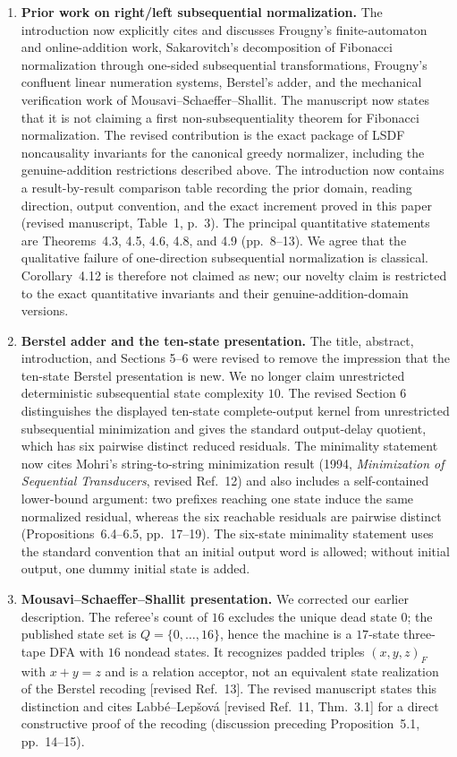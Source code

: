 \documentclass[11pt]{article}
\begin{document}
\begin{enumerate}[leftmargin=*]
\item \textbf{Prior work on right/left subsequential normalization.}
The introduction now explicitly cites and discusses Frougny's finite-automaton
and online-addition work, Sakarovitch's decomposition of Fibonacci
normalization through one-sided subsequential transformations, Frougny's
confluent linear numeration systems, Berstel's adder, and the mechanical
verification work of Mousavi--Schaeffer--Shallit.  The manuscript now states
that it is not claiming a first non-subsequentiality theorem for Fibonacci
normalization.  The revised contribution is the exact package of LSDF
noncausality invariants for the canonical greedy normalizer, including the
genuine-addition restrictions described above.  The introduction now contains
a result-by-result comparison table recording the prior domain, reading
direction, output convention, and the exact increment proved in this paper
(revised manuscript, Table~1, p.~3).  The principal quantitative statements
are Theorems~4.3, 4.5, 4.6, 4.8, and 4.9 (pp.~8--13).
We agree that the qualitative failure of one-direction subsequential
normalization is classical.  Corollary~4.12 is therefore not claimed as new;
our novelty claim is restricted to the exact quantitative invariants and
their genuine-addition-domain versions.

\item \textbf{Berstel adder and the ten-state presentation.}
The title, abstract, introduction, and Sections 5--6 were revised to remove
the impression that the ten-state Berstel presentation is new.  We no longer
claim unrestricted deterministic subsequential state complexity $10$.  The
revised Section 6 distinguishes the displayed ten-state complete-output kernel
from unrestricted subsequential minimization and gives the standard
output-delay quotient, which has six pairwise distinct reduced residuals.  The
minimality statement now cites Mohri's string-to-string minimization result
(1994, \emph{Minimization of Sequential Transducers}, revised Ref.~12) and
also includes a self-contained lower-bound argument: two prefixes reaching
one state induce the same normalized residual, whereas the six reachable
residuals are pairwise distinct (Propositions~6.4--6.5, pp.~17--19).  The
six-state minimality statement uses the standard convention that an initial
output word is allowed; without initial output, one dummy initial state is
added.

\item \textbf{Mousavi--Schaeffer--Shallit presentation.}
We corrected our earlier description.  The referee's count of $16$ excludes
the unique dead state $0$; the published state set is $Q=\{0,\ldots,16\}$,
hence the machine is a $17$-state three-tape DFA with $16$ nondead states.  It
recognizes padded triples $(x,y,z)_F$ with $x+y=z$ and is a relation acceptor,
not an equivalent state realization of the Berstel recoding [revised Ref.~13].
The revised manuscript states this distinction and cites
Labb\'e--Lep\v{s}ov\'a [revised Ref.~11, Thm.~3.1] for a direct constructive
proof of the recoding (discussion preceding Proposition~5.1, pp.~14--15).


\end{enumerate}
\end{document}
